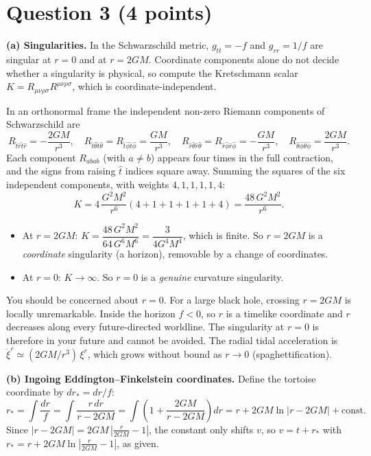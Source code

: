 \documentclass[12pt]{article}
\begin{document}
\section*{Question 3 (4 points)}

\textbf{(a) Singularities.} In the Schwarzschild metric, $g_{tt}=-f$ and $g_{rr}=1/f$ are singular at $r=0$ and at $r=2GM$. Coordinate components alone do not decide whether a singularity is physical, so compute the Kretschmann scalar $K=R_{\mu\nu\rho\sigma}R^{\mu\nu\rho\sigma}$, which is coordinate-independent.

In an orthonormal frame the independent non-zero Riemann components of Schwarzschild are
\[
R_{\hat t\hat r\hat t\hat r}=-\frac{2GM}{r^3},\quad
R_{\hat t\hat\theta\hat t\hat\theta}=R_{\hat t\hat\phi\hat t\hat\phi}=\frac{GM}{r^3},\quad
R_{\hat r\hat\theta\hat r\hat\theta}=R_{\hat r\hat\phi\hat r\hat\phi}=-\frac{GM}{r^3},\quad
R_{\hat\theta\hat\phi\hat\theta\hat\phi}=\frac{2GM}{r^3}.
\]
Each component $R_{abab}$ (with $a\neq b$) appears four times in the full contraction, and the signs from raising $\hat t$ indices square away. Summing the squares of the six independent components, with weights $4,1,1,1,1,4$:
\[
K=4\,\frac{G^2M^2}{r^6}\left(4+1+1+1+1+4\right)=\frac{48\,G^2M^2}{r^6}.
\]
\begin{itemize}
\item At $r=2GM$: $K=\dfrac{48\,G^2M^2}{64\,G^6M^6}=\dfrac{3}{4G^4M^4}$, which is finite. So $r=2GM$ is a \emph{coordinate} singularity (a horizon), removable by a change of coordinates.
\item At $r=0$: $K\to\infty$. So $r=0$ is a \emph{genuine} curvature singularity.
\end{itemize}

You should be concerned about $r=0$. For a large black hole, crossing $r=2GM$ is locally unremarkable. Inside the horizon $f<0$, so $r$ is a timelike coordinate and $r$ decreases along every future-directed worldline. The singularity at $r=0$ is therefore in your future and cannot be avoided. The radial tidal acceleration is $\ddot\xi^r\simeq(2GM/r^3)\,\xi^r$, which grows without bound as $r\to 0$ (spaghettification).

\textbf{(b) Ingoing Eddington--Finkelstein coordinates.} Define the tortoise coordinate by $dr_*=dr/f$:
\[
r_*=\int\frac{dr}{f}=\int\frac{r\,dr}{r-2GM}=\int\left(1+\frac{2GM}{r-2GM}\right)dr=r+2GM\ln|r-2GM|+\text{const}.
\]
Since $|r-2GM|=2GM\,\left|\frac{r}{2GM}-1\right|$, the constant only shifts $v$, so $v=t+r_*$ with $r_*=r+2GM\ln\left|\frac{r}{2GM}-1\right|$, as given.
\end{document}
